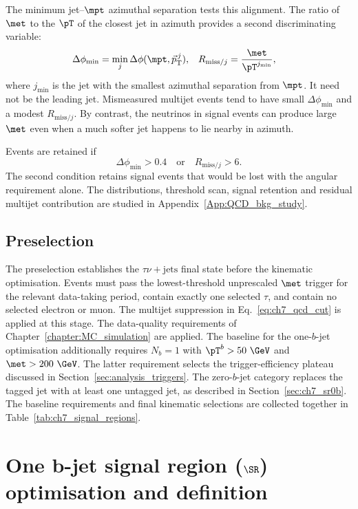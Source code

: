 The minimum jet--$\mpt$ azimuthal separation tests this alignment.
The ratio of $\met$ to the $\pT$ of the closest jet in azimuth provides a second discriminating variable:
\begin{align}
    \Delta\phi_{\min} &= \min_j\Delta\phi(\mpt,\vec p_{\mathrm{T}}^{\,j}),
    &R_{\mathrm{miss}/j} &= \frac{\met}{\pT^{j_{\min}}},
    \label{eq:ch7_qcd_variables}
\end{align}
where $j_{\min}$ is the jet with the smallest azimuthal separation from $\mpt$.
It need not be the leading jet.
Mismeasured multijet events tend to have small $\Delta\phi_{\min}$ and a modest $R_{\mathrm{miss}/j}$.
By contrast, the neutrinos in signal events can produce large $\met$ even when a much softer jet happens to lie nearby in azimuth.

Events are retained if
\begin{equation}
    \Delta\phi_{\min}>0.4
    \quad\text{or}\quad
    R_{\mathrm{miss}/j}>6.
    \label{eq:ch7_qcd_cut}
\end{equation}
The second condition retains signal events that would be lost with the angular requirement alone.
The distributions, threshold scan, signal retention and residual multijet contribution are studied in Appendix~\ref{App:QCD_bkg_study}.

\subsection{Preselection}
\label{subsec:ch7_common_preselection}

The preselection establishes the $\tau\nu+\mathrm{jets}$ final state before the kinematic optimisation.
Events must pass the lowest-threshold unprescaled $\met$ trigger for the relevant data-taking period, contain exactly one selected $\tau$, and contain no selected electron or muon.
The multijet suppression in Eq.~\ref{eq:ch7_qcd_cut} is applied at this stage.
The data-quality requirements of Chapter~\ref{chapter:MC_simulation} are applied.
The baseline for the one-$b$-jet optimisation additionally requires $N_b=1$ with $\pT^b>50~\GeV$ and $\met>200~\GeV$.
The latter requirement selects the trigger-efficiency plateau discussed in Section~\ref{sec:analysis_triggers}.
The zero-$b$-jet category replaces the tagged jet with at least one untagged jet, as described in Section~\ref{sec:ch7_sr0b}.
The baseline requirements and final kinematic selections are collected together in Table~\ref{tab:ch7_signal_regions}.

\section[One b-jet signal region (SR1b) optimisation and definition]{One b-jet signal region ($\SR$) optimisation and definition}
\label{sec:ch7_sr1b}

